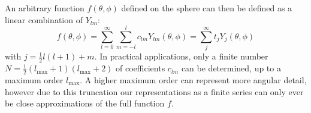 An arbitrary function $f(\theta,\phi)$ defined on the sphere can then be defined as a linear combination of $Y_{lm}$:
\begin{equation}
  f(\theta,\phi) = \sum_{l=0}^{\infty}\sum_{m=-l}^{l} c_{lm}Y_{lm}(\theta,\phi) = \sum_j^{\infty} t_jY_j(\theta, \phi)
\end{equation}
with $j = \frac{1}{2}l(l+1) + m$.
In practical applications, only a finite number $N = \frac{1}{2}(l_{\text{max}}+1)(l_{\text{max}}+2)$ of coefficients $c_{lm}$ can be determined, up to a maximum order $l_{\text{max}}$.
A higher maximum order can represent more angular detail, however due to this truncation our representations as a finite series can only ever be close approximations of the full function $f$.
